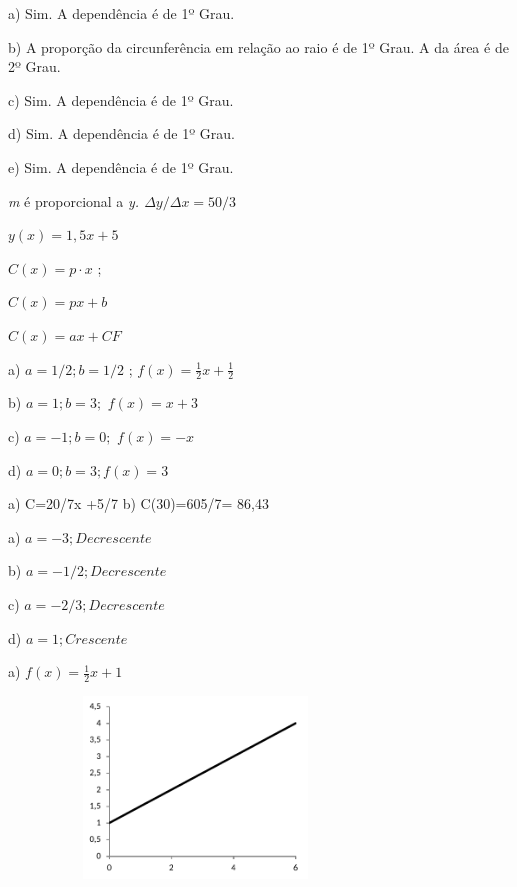 \begin{respostas}{3}
\ansitem{} a) Sim. A dependência é de 1º Grau.

b) A proporção da circunferência em relação ao raio é de 1º Grau. A da área é de 2º Grau.

c) Sim. A dependência é de 1º Grau.

d) Sim. A dependência é de 1º Grau.

e) Sim. A dependência é de 1º Grau.

\ansitem{} \textit{m }é proporcional a \textit{y.  \(  \Delta y/ \Delta x=50/3 \) }

\ansitem{}  \( y \left( x \right) =1,5x+5 \) 

\ansitem{}  \( C \left( x \right) =p \cdot x \) ; 

\ansitem{}  \( C \left( x \right) =px+b \) 

\ansitem{}  \( C \left( x \right) =ax+CF \) 

\ansitem{} a)  \( a=1/2; b= 1/2 \) ;  \( f \left( x \right) =\frac{1}{2}x+\frac{1}{2} \) \tab \tab 

b)  \( a=1; b= 3; \)   \( f \left( x \right) =x+3 \) \tab \tab 

c) \(  a= -1; b= 0; \)   \( f \left( x \right) =-x \) \tab \tab 

d) \(  a= 0; b= 3; f \left( x \right) =3 \) 

\ansitem{} a) C=20/7x +5/7 \qquad b) C(30)=605/7= 86,43

\ansitem{}

\begin{multicols}{2}
a)  \( a=-3; Decrescente \)

b)  \( a=-1/2; Decrescente \) 

c)  \( a= -2/3; Decrescente \)

d) \(  a=1; Crescente \)
\end{multicols}

\ansitem{} a) \( f \left( x \right) =\frac{1}{2}x+1 \)  

\begin{figure}[H]
	\begin{Center}
		\includegraphics[width=3.07in,height=1.91in]{capitulos/funcao_do_primeiro_grau/media/image42.pdf}
	\end{Center}
\end{figure}


\end{respostas}
